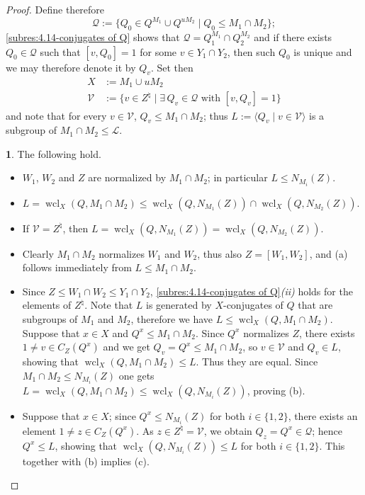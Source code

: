 \documentclass{amsart}
\numberwithin{equation}{section}
\theoremstyle{definition}
\theoremstyle{subresult}
\newtheorem{subresult}{}[equation]
\theoremstyle{caseresult}
\renewcommand{\L}{\mathcal{L}}
\newcommand{\V}{\mathcal{V}}
\newcommand{\wcl}{\operatorname{wcl}}
\newcommand{\<}{\langle}
\renewcommand{\>}{\rangle}
\begin{document}
\begin{proof}
	Define therefore
	\[
	\mathcal{Q} := \{Q_0 \in Q^{M_1} \cup Q^{uM_2} \mid  Q_0 \le M_1 \cap M_2 \};
	\]
	\eqref{subres:4.14-conjugates of Q}  shows that $\mathcal{Q} = Q_1^{M_1} \cap Q_2^{M_2}$ and if there exists $Q_0 \in \mathcal{Q}$ such that $[v,Q_0]=1$ for some $v \in Y_1\cap Y_2$, then such $Q_0$ is unique and we may therefore denote it by $Q_v$. Set then
	\begin{align*}
		X & := M_1 \cup uM_2 \\
		\V &  := \{v \in Z^\natural \mid \exists \, Q_v \in \mathcal{Q} \text{ with $[v,Q_v] =1$} \}
	\end{align*}
	and note that for every $v \in \V$, $Q_v \le M_1 \cap M_2$; thus $L := \< Q_v \mid v \in \V \>$ is a subgroup of $M_1 \cap M_2 \le \L$.
	
	
	\begin{subresult}\label{4.14-4}
		The following hold.
		\begin{itemize}
			\item[(a)] $W_1$, $W_2$ and $Z$ are normalized by $M_1 \cap M_2$; in particular $L\le N_{M_i}(Z)$.
			\item[(b)] $L = \wcl_{X}(Q,M_1 \cap M_2) \le \wcl_{X}(Q, N_{M_1}(Z)) \cap \wcl_{X}(Q,N_{M_2}(Z))$.
			\item[(c)] If $\V = Z^\natural$, then $L = \wcl_{X}(Q, N_{M_1}(Z)) = \wcl_{X}(Q,N_{M_2}(Z))$.
		\end{itemize}
	\end{subresult}
	
	\begin{itemize}
		\item[(a)] Clearly $M_1 \cap M_2$ normalizes $W_1$ and $W_2$, thus also $Z= [W_1,W_2]$, and (a) follows immediately from $L \le M_1 \cap M_2$.
		\item[(b)] Since $Z \le W_1 \cap W_2 \le Y_1 \cap Y_2$, \eqref{subres:4.14-conjugates of Q}\textit{(ii)} holds for the elements of $Z^\natural$. Note that $L$ is generated by $X$-conjugates of $Q$ that are subgroups of $M_1$ and $M_2$, therefore we have $L \le \wcl_{X}(Q,M_1 \cap M_2)$. Suppose that $x \in X$ and $Q^x \le M_1 \cap M_2$. Since $Q^x$ normalizes $Z$, there exists $1 \ne v \in C_Z(Q^x)$ and we get $Q_v=Q^x \le M_1 \cap M_2$, so $v \in \V$ and $Q_v \in L$, showing that $\wcl_{X}(Q,M_1 \cap M_2) \le L$. Thus they are equal. Since $M_1 \cap M_2 \le N_{M_i}(Z)$ one gets $L =  \wcl_{X}(Q,M_1 \cap M_2) \le \wcl_{X}(Q, N_{M_i}(Z))$, proving (b).
		\item[(c)] Suppose that $x \in X$; since $Q^x \le N_{M_i}(Z)$ for both $i \in \{1,2\}$, there exists an element $1 \ne z \in C_Z(Q^x)$.  As $z \in Z^\natural = \V$, we obtain  $Q_z=Q^x \in \mathcal{Q}$; hence $Q^x \le L$, showing that $\wcl_{X}(Q,N_{M_i}(Z)) \le L$ for both $i \in \{1,2\}$. This together with (b) implies (c).
	\end{itemize}
	

\end{proof}
\end{document}
